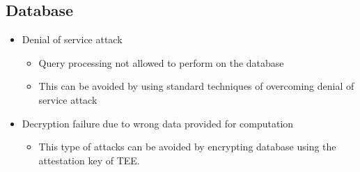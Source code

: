 \subsection{Database}
\begin{itemize}
    \item Denial of service attack
          \begin{itemize}
              \item Query processing not allowed to perform on the database
              \item This can be avoided by using standard techniques of overcoming denial of service attack
          \end{itemize}
    \item Decryption failure due to wrong data provided for computation
          \begin{itemize}
              \item This type of attacks can be avoided by encrypting database using the attestation key of TEE.
          \end{itemize}
\end{itemize}

